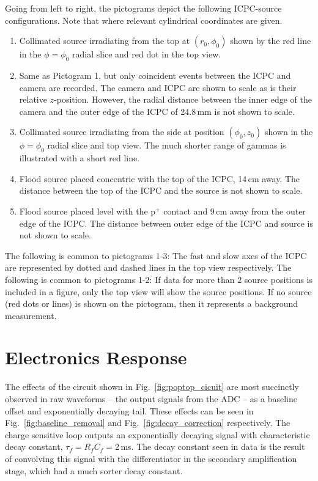 \noindent Going from left to right, the pictograms depict the following ICPC-source configurations. Note that where relevant cylindrical coordinates are given.
\begin{enumerate}
	\item Collimated \CsS{} source irradiating from the top at $(r_0,\phi_0)$ shown by the red line in the $\phi=\phi_0$ radial slice and red dot in the top view.
	\item Same as Pictogram 1, but only coincident events between the ICPC and camera are recorded. The camera and ICPC are shown to scale as is their relative $z$-position. However, the radial distance between the inner edge of the camera and the outer edge of the ICPC of 24.8\,mm is not shown to scale. 
	\item Collimated \BaS{} source irradiating from the side at position $(\phi_0,z_0)$ shown in the $\phi=\phi_0$ radial slice and top view. The much shorter range of \BaS{} gammas is illustrated with a short red line.
	\item Flood \ThS{} source placed concentric with the top of the ICPC, 14\,cm away. The distance between the top of the ICPC and the source is not shown to scale. 
	\item Flood \ThS{} source placed level with the p$^+$ contact and 9\,cm away from the outer edge of the ICPC. The distance between outer edge of the ICPC and source is not shown to scale. 
\end{enumerate}
The following is common to pictograms 1-3: The fast and slow axes of the ICPC are represented by dotted and dashed lines in the top view respectively. The following is common to pictograms 1-2: If data for more than 2 source positions is included in a figure, only the top view will show the source positions. If no source (red dots or lines) is shown on the pictogram, then it represents a background measurement. 

\section{Electronics Response}\label{sec:electronicsresponse}

The effects of the circuit shown in Fig.~\ref{fig:poptop_cicuit} are most succinctly observed in raw waveforms -- the output signals from the ADC -- as a baseline offset and exponentially decaying tail. These effects can be seen in Fig.~\ref{fig:baseline_removal} and Fig.~\ref{fig:decay_correction} respectively. The charge sensitive loop outputs an exponentially decaying signal with characteristic decay constant, $\tau_f = R_fC_f = 2$\,ms. The decay constant seen in data is the result of convolving this signal with the differentiator in the secondary amplification stage, which had a much sorter decay constant. 

